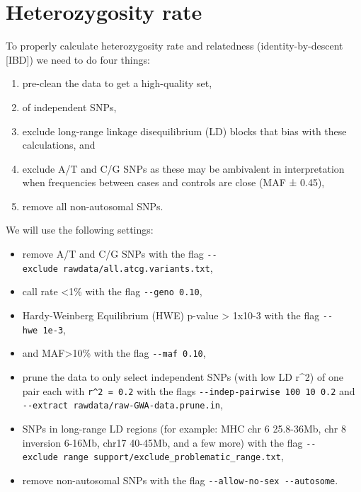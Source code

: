\documentclass[
]{book}
\providecommand{\tightlist}{%
  \setlength{\itemsep}{0pt}\setlength{\parskip}{0pt}}
\begin{document}
\hypertarget{heterozygosity-rate}{%
\section{Heterozygosity rate}\label{heterozygosity-rate}}

To properly calculate heterozygosity rate and relatedness (identity-by-descent {[}IBD{]}) we need to do four things:

\begin{enumerate}
\def\labelenumi{\arabic{enumi})}
\tightlist
\item
  pre-clean the data to get a high-quality set,
\item
  of independent SNPs,
\item
  exclude long-range linkage disequilibrium (LD) blocks that bias with these calculations, and
\item
  exclude A/T and C/G SNPs as these may be ambivalent in interpretation when frequencies between cases and controls are close (MAF ± 0.45),
\item
  remove all non-autosomal SNPs.
\end{enumerate}

We will use the following settings:

\begin{itemize}
\tightlist
\item
  remove A/T and C/G SNPs with the flag \texttt{-\/-exclude\ rawdata/all.atcg.variants.txt},
\item
  call rate \textless1\% with the flag \texttt{-\/-geno\ 0.10},
\item
  Hardy-Weinberg Equilibrium (HWE) p-value \textgreater{} 1x10-3 with the flag \texttt{-\/-hwe\ 1e-3},
\item
  and MAF\textgreater10\% with the flag \texttt{-\/-maf\ 0.10},
\item
  prune the data to only select independent SNPs (with low LD r\^{}2) of one pair each with \texttt{r\^{}2\ =\ 0.2} with the flags \texttt{-\/-indep-pairwise\ 100\ 10\ 0.2} and \texttt{-\/-extract\ rawdata/raw-GWA-data.prune.in},
\item
  SNPs in long-range LD regions (for example: MHC chr 6 25.8-36Mb, chr 8 inversion 6-16Mb, chr17 40-45Mb, and a few more) with the flag \texttt{-\/-exclude\ range\ support/exclude\_problematic\_range.txt},
\item
  remove non-autosomal SNPs with the flag \texttt{-\/-allow-no-sex\ -\/-autosome}.
\end{itemize}
\end{document}
